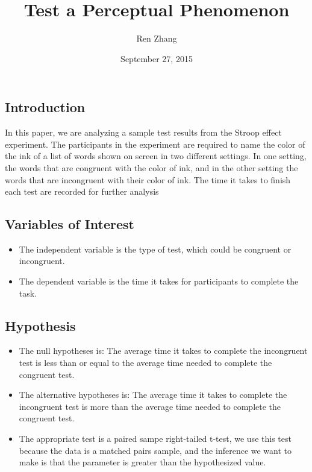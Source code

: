 \documentclass[]{article}
\title{Test a Perceptual Phenomenon}
\author{Ren Zhang}
\date{September 27, 2015}
\begin{document}
\maketitle


{
\hypersetup{linkcolor=black}
\setcounter{tocdepth}{2}
\tableofcontents
}
\subsection{Introduction}\label{introduction}

In this paper, we are analyzing a sample test results from the Stroop
effect experiment. The participants in the experiment are required to
name the color of the ink of a list of words shown on screen in two
different settings. In one setting, the words that are congruent with
the color of ink, and in the other setting the words that are
incongruent with their color of ink. The time it takes to finish each
test are recorded for further analysis

\subsection{Variables of Interest}\label{variables-of-interest}

\begin{itemize}
\itemsep1pt\parskip0pt
\item
  The independent variable is the type of test, which could be congruent
  or incongruent.\\
\item
  The dependent variable is the time it takes for participants to
  complete the task.
\end{itemize}

\subsection{Hypothesis}\label{hypothesis}

\begin{itemize}
\itemsep1pt\parskip0pt
\item
  The null hypotheses is: The average time it takes to complete the
  incongruent test is less than or equal to the average time needed to
  complete the congruent test.\\
\item
  The alternative hypotheses is: The average time it takes to complete
  the incongruent test is more than the average time needed to complete
  the congruent test.\\
\item
  The appropriate test is a paired sampe right-tailed t-test, we use
  this test because the data is a matched pairs sample, and the
  inference we want to make is that the parameter is greater than the
  hypothesized value.
\end{itemize}
\end{document}
